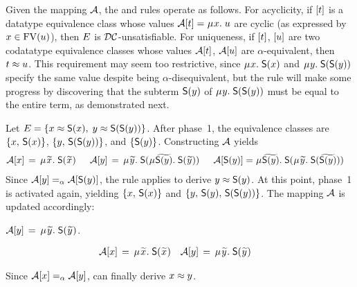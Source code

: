 Given the mapping $\mathcal{A}$, the  and  rules operate as follows.
For acyclicity, if $[t]$ is a datatype equivalence class
whose values $\Val \ec{t} = \MU x.\; u$ are cyclic
(as expressed by $x \in \mathrm{FV}( u )$),
then $E$ is $\mathcal{DC}$-unsatisfiable.
For uniqueness, if $[t]$, $[u]$ are two codatatype equivalence classes
whose values $\mathcal{A} [t]$, $\mathcal{A} [u]$ are $\alpha$-equivalent,
then $t \approx u$. This requirement may seem too restrictive, since
$\MU x.\; \const{S}(x)$ and $\MU y.\; \const{S}(\const{S}(y))$ specify the same
value despite being $\alpha$-disequivalent, but the rule will
make some progress by discovering that the subterm $\textsf{S}(y)$ of $\MU y.\;
\const{S}(\const{S}(y))$ must be equal to the entire term,
as demonstrated next.


\begin{examplex}
Let $E = \{ x \approx \textsf{S}(x),\; y \approx \textsf{S}(\textsf{S}(y)) \}$.
After phase~1, the equivalence classes %
are
$\{ x,\, \textsf{S}(x) \}$,
$\{ y,\, \textsf{S}(\textsf{S}(y)) \}$,
and $\{ \textsf{S}(y) \}$.
Constructing $\mathcal{A}$ yields
\begin{align*}
\Val \ec{x} & \,=\, \MU {\Varec{x}}.\; \const{S}(\Varec{x}) &
\enskip %
\Val \ec{y} & \,=\,
\MU {\Varec{y}}.\; \const{S}(\smash{\MU {\VAREC{\const{S}(y)}}}.\; \const{S}( {\Varec{y}} ) )
\enskip %
 &
\Val \ec{\const{S}(y)} & =
\MU {\VAREC{\const{S}(y)}}.\; \const{S}(\MU {\Varec{y}}.\; \const{S}( {\VAREC{\const{S}(y)}} ) )
\end{align*}
Since $\mathcal{A} [y] \mathrel{=_\alpha} \mathcal{A} [\textsf{S}(y)]$,
the  rule applies to derive $y \approx \textsf{S}(y)$.
%
At this point, phase~1 is activated again, %
yielding
$\{ x,\, \textsf{S}(x) \}$ and
$\{ y,\, \textsf{S}(y),\allowbreak\, \textsf{S}(\textsf{S}(y)) \}$.
The mapping $\mathcal{A}$ is updated accordingly:
\begin{conf}%
$\Val \ec{y} \,=\, \MU {\Varec{y}}.\; \const{S}({\Varec{y}})$.
\end{conf}%
\begin{rep}
\begin{align*}
\Val \ec{x} & \,=\, \MU {\Varec{x}}.\; \const{S}(\Varec{x})
&
\Val \ec{y} & \,=\, \MU {\Varec{y}}.\; \const{S}({\Varec{y}})
\end{align*}
\end{rep}
Since $\mathcal{A} [x] \mathrel{=_\alpha} \mathcal{A} [y]$,
 can finally derive $x \approx y$.
\xend
\end{examplex}

